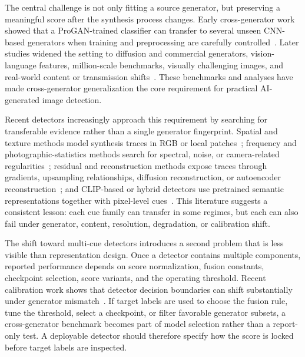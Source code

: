 \documentclass[lettersize,journal]{IEEEtran}
\begin{document}
The central challenge is not only fitting a source generator, but preserving a meaningful score after the synthesis process changes. Early cross-generator work showed that a ProGAN-trained classifier can transfer to several unseen CNN-based generators when training and preprocessing are carefully controlled~\cite{wang2020cnnspot}. Later studies widened the setting to diffusion and commercial generators, vision-language features, million-scale benchmarks, visually challenging images, and real-world content or transmission shifts~\cite{ojha2023univfd,zhu2023genimage,zhong2023patchcraft,yan2025aide,li2025rrdataset}. These benchmarks and analyses have made cross-generator generalization the core requirement for practical AI-generated image detection.

Recent detectors increasingly approach this requirement by searching for transferable evidence rather than a single generator fingerprint. Spatial and texture methods model synthesis traces in RGB or local patches~\cite{wang2020cnnspot,liu2020gramnet,zhong2023patchcraft}; frequency and photographic-statistics methods search for spectral, noise, or camera-related regularities~\cite{frank2020frequency,liu2022realimages,karageorgiou2025spai,zhong2025beyond}; residual and reconstruction methods expose traces through gradients, upsampling relationships, diffusion reconstruction, or autoencoder reconstruction~\cite{tan2023lgrad,tan2024npr,wang2023dire,ricker2024aeroblade}; and CLIP-based or hybrid detectors use pretrained semantic representations together with pixel-level cues~\cite{radford2021clip,ojha2023univfd,cozzolino2024clip,yan2025aide,cheng2025cospy}. This literature suggests a consistent lesson: each cue family can transfer in some regimes, but each can also fail under generator, content, resolution, degradation, or calibration shift.

The shift toward multi-cue detectors introduces a second problem that is less visible than representation design. Once a detector contains multiple components, reported performance depends on score normalization, fusion constants, checkpoint selection, score variants, and the operating threshold. Recent calibration work shows that detector decision boundaries can shift substantially under generator mismatch~\cite{yang2026calibrated}. If target labels are used to choose the fusion rule, tune the threshold, select a checkpoint, or filter favorable generator subsets, a cross-generator benchmark becomes part of model selection rather than a report-only test. A deployable detector should therefore specify how the score is locked before target labels are inspected.
\end{document}
